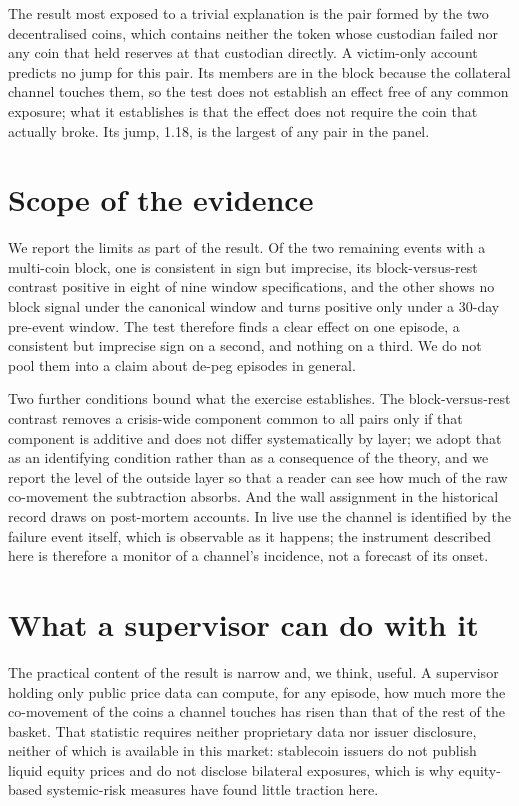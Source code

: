 The result most exposed to a trivial explanation is the pair formed by the two decentralised coins, which contains neither the token whose custodian failed nor any coin that held reserves at that custodian directly. A victim-only account predicts no jump for this pair. Its members are in the block because the collateral channel touches them, so the test does not establish an effect free of any common exposure; what it establishes is that the effect does not require the coin that actually broke. Its jump, 1.18, is the largest of any pair in the panel.

\section*{Scope of the evidence}

We report the limits as part of the result. Of the two remaining events with a multi-coin block, one is consistent in sign but imprecise, its block-versus-rest contrast positive in eight of nine window specifications, and the other shows no block signal under the canonical window and turns positive only under a 30-day pre-event window. The test therefore finds a clear effect on one episode, a consistent but imprecise sign on a second, and nothing on a third. We do not pool them into a claim about de-peg episodes in general.

Two further conditions bound what the exercise establishes. The block-versus-rest contrast removes a crisis-wide component common to all pairs only if that component is additive and does not differ systematically by layer; we adopt that as an identifying condition rather than as a consequence of the theory, and we report the level of the outside layer so that a reader can see how much of the raw co-movement the subtraction absorbs. And the wall assignment in the historical record draws on post-mortem accounts. In live use the channel is identified by the failure event itself, which is observable as it happens; the instrument described here is therefore a monitor of a channel's incidence, not a forecast of its onset.

\section*{What a supervisor can do with it}

The practical content of the result is narrow and, we think, useful. A supervisor holding only public price data can compute, for any episode, how much more the co-movement of the coins a channel touches has risen than that of the rest of the basket. That statistic requires neither proprietary data nor issuer disclosure, neither of which is available in this market: stablecoin issuers do not publish liquid equity prices and do not disclose bilateral exposures, which is why equity-based systemic-risk measures have found little traction here.

